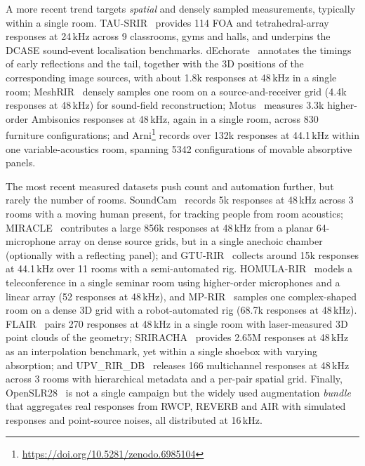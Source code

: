 A more recent trend targets \emph{spatial} and densely sampled measurements,
typically within a single room. TAU-SRIR~\citep{politis2020dataset} provides
114 \acrshort{FOA} and tetrahedral-array responses at 24\,kHz across 9
classrooms, gyms and halls, and underpins the DCASE sound-event localisation
benchmarks. dEchorate~\citep{carlo2021dechorate} annotates the timings of
early reflections and the tail, together with the 3D positions of the
corresponding image sources, with about 1.8k responses at 48\,kHz in a single
room; MeshRIR~\citep{koyama2021meshrir} densely samples one room on a
source-and-receiver grid (4.4k responses at 48\,kHz) for sound-field
reconstruction; Motus~\citep{gotz2021dataset} measures 3.3k higher-order
Ambisonics responses at 48\,kHz, again in a single room, across 830 furniture
configurations; and Arni\footnote{\url{https://doi.org/10.5281/zenodo.6985104}}
records over 132k responses at 44.1\,kHz within one variable-acoustics room,
spanning 5342 configurations of movable absorptive panels.

The most recent measured datasets push count and automation further, but
rarely the number of rooms. SoundCam~\citep{wang2023soundcam} records 5k
responses at 48\,kHz across 3 rooms with a moving human present, for tracking
people from room acoustics; MIRACLE~\citep{kujawski2024miracle} contributes a
large 856k responses at 48\,kHz from a planar 64-microphone array on dense
source grids, but in a single anechoic chamber (optionally with a reflecting
panel); and GTU-RIR~\citep{pekmezci2024evaluation} collects around 15k
responses at 44.1\,kHz over 11 rooms with a semi-automated rig.
HOMULA-RIR~\citep{miotello2024homula} models a teleconference in a single
seminar room using higher-order microphones and a linear array (52 responses
at 48\,kHz), and MP-RIR~\citep{friede2024multi} samples one complex-shaped
room on a dense 3D grid with a robot-automated rig (68.7k responses at
48\,kHz). FLAIR~\citep{sundstrom2025bayesian} pairs 270 responses at 48\,kHz
in a single room with laser-measured 3D point clouds of the geometry;
SRIRACHA~\citep{pelling2025sriracha} provides 2.65M responses at 48\,kHz as an
interpolation benchmark, yet within a single shoebox with varying absorption;
and UPV\_RIR\_DB~\citep{garciagamborino2026upv} releases 166 multichannel
responses at 48\,kHz across 3 rooms with hierarchical metadata and a per-pair
spatial grid. Finally, OpenSLR28~\citep{ko2017study} is not a single campaign
but the widely used augmentation \emph{bundle} that aggregates real responses
from RWCP, REVERB and AIR with simulated responses and point-source noises,
all distributed at 16\,kHz.

